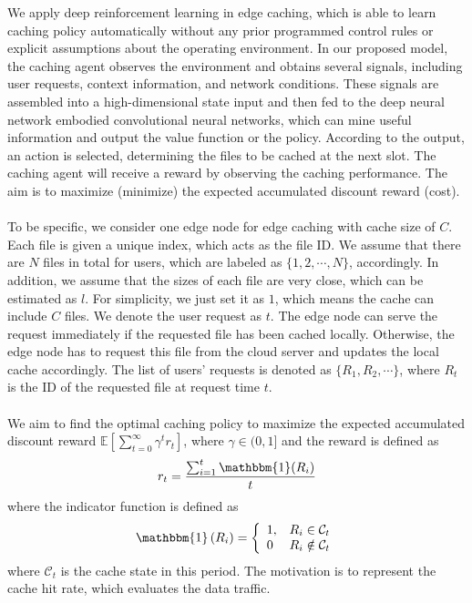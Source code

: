 \documentclass[a4paper,12pt]{article}
\begin{document}
We apply deep reinforcement learning in edge caching, which is able to learn caching policy automatically without any prior programmed control rules or explicit assumptions about the operating environment. In our proposed model, the caching agent observes the environment and obtains several signals, including user requests, context information, and network conditions. These signals are assembled into a high-dimensional state input and then fed to the deep neural network embodied convolutional neural networks, which can mine useful information and output the value function or the policy. According to the output, an action is selected, determining the files to be cached at the next slot. The caching agent will receive a reward by observing the caching performance. The aim is to maximize (minimize) the expected accumulated discount reward (cost).\\~\\
To be specific, we consider one edge node for edge caching with cache size of $C$. Each file is given a unique index, which acts as the file ID. 
We assume that there are $N$ files in total for users, which are labeled as $\{1,2,\cdots,N\}$, accordingly. In addition, we assume that the sizes of each file are very close, which can be estimated as $l$. For simplicity, we just set it as $1$, which means the cache can include $C$ files. We denote the user request as $t$. The edge node can serve the request immediately if the requested file has been cached locally. Otherwise, the edge node has to request this file from the cloud server and updates the local cache accordingly. The list of users' requests is denoted as $\{R_1,R_2,\cdots\}$, where $R_t$ is the ID of the requested file at request time $t$. \\~\\
We aim to find the optimal caching policy to maximize the expected accumulated discount reward $\mathbb{E}\left[\sum_{t=0}^{\infty}\gamma^tr_t\right]$, where $\gamma\in(0,1]$ and the reward is defined as 
$$r_t=\frac{\sum_{i=1}^t\mathbbm{1}(R_i)}{t}$$
where the indicator function is defined as
$$
\mathbbm{1}\left(R_{i}\right)=\left\{\begin{array}{ll}{1,} & {R_{i} \in \mathcal{C}_{t}} \\ {0} & {R_{i} \notin \mathcal{C}_{t}}\end{array}\right.
$$
where $\mathcal{C}_t$ is the cache state in this period. The motivation is to represent the cache hit rate, which evaluates the data traffic.\\~\\
\end{document}
